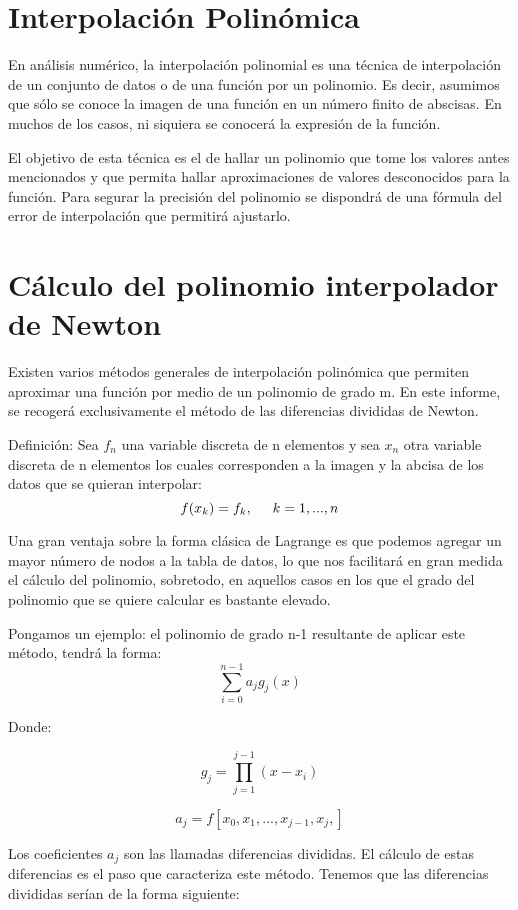 



\section{Interpolación Polinómica}
\label{2:sec:1}
En análisis numérico, la interpolación polinomial es una técnica de interpolación de un conjunto de datos o de una función por un polinomio. Es decir, asumimos que sólo se conoce la imagen de una función en un número finito de abscisas. En muchos de los casos, ni siquiera se conocerá la expresión de la función.\par El objetivo de esta técnica es el de hallar un polinomio que tome los valores antes mencionados y que permita hallar aproximaciones de valores desconocidos para la función. Para segurar la precisión del polinomio se dispondrá de una fórmula del error de interpolación que permitirá ajustarlo.

\section{Cálculo del polinomio interpolador de Newton}
\label{2:sec:2}
  Existen varios métodos generales de interpolación polinómica que permiten aproximar una función por medio de un polinomio de grado m. En este informe, se recogerá exclusivamente el método de las diferencias divididas de Newton.\par Definición: Sea $f_{n}$  una variable discreta de n  elementos y sea $x_{n}$ otra variable discreta de n elementos los cuales corresponden a la imagen y la abcisa de los datos que se quieran interpolar:
  \[f(x_{k})=f_{k}, \hspace{0.5 cm} k=1,...,n\]\par
  Una gran ventaja sobre la forma clásica de Lagrange es que podemos agregar un mayor número de nodos a la tabla de datos, lo que nos facilitará en gran medida el cálculo del polinomio, sobretodo, en aquellos casos en los que el grado del polinomio que se quiere calcular es bastante elevado.\par Pongamos un ejemplo: el polinomio de grado n-1  resultante de aplicar este método, tendrá la forma:
  \[\sum_{i=0}^{n-1} {a_j}{g_j}(x)\]\par Donde:\par \[ g_{j}=\prod_{j=1}^{j-1}{(x-x_{i})}\]\par
  \[ a_{j}=f[x_{0},x_{1},...,x_{j-1},x_{j},]\]\par Los coeficientes $a_{j}$ son las llamadas diferencias divididas. El cálculo de estas diferencias es el paso que caracteriza este método. Tenemos que las diferencias divididas serían de la forma siguiente:
  
